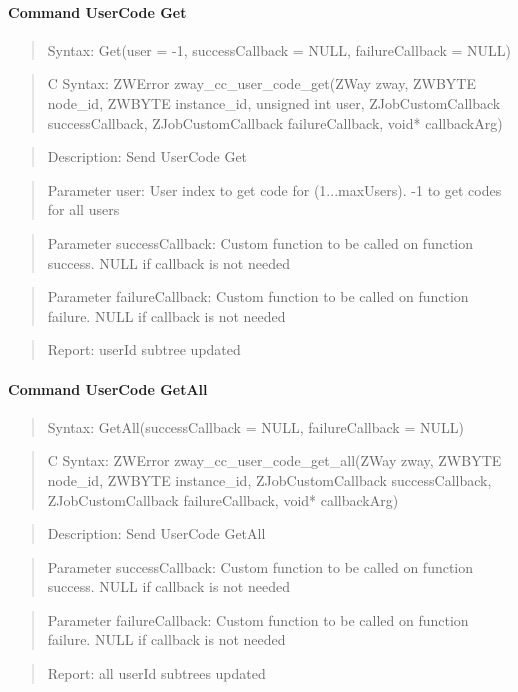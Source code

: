 \paragraph{Command UserCode Get}
\begin{quote}Syntax: Get(user = -1, successCallback = NULL, failureCallback = NULL)\end{quote}
\begin{quote}C Syntax: ZWError zway\_cc\_user\_code\_get(ZWay zway, ZWBYTE node\_id, ZWBYTE instance\_id, unsigned int user, ZJobCustomCallback successCallback, ZJobCustomCallback failureCallback, void* callbackArg)\end{quote}
\begin{quote}Description: Send UserCode Get\end{quote}
\begin{quote}Parameter user: User index to get code for (1...maxUsers). -1 to get codes for all users\end{quote}
\begin{quote}Parameter successCallback: Custom function to be called on function success. NULL if callback is not needed\end{quote}
\begin{quote}Parameter failureCallback: Custom function to be called on function failure. NULL if callback is not needed\end{quote}
\begin{quote}Report: userId subtree updated\end{quote}

\paragraph{Command UserCode GetAll}
\begin{quote}Syntax: GetAll(successCallback = NULL, failureCallback = NULL)\end{quote}
\begin{quote}C Syntax: ZWError zway\_cc\_user\_code\_get\_all(ZWay zway, ZWBYTE node\_id, ZWBYTE instance\_id, ZJobCustomCallback successCallback, ZJobCustomCallback failureCallback, void* callbackArg)\end{quote}
\begin{quote}Description: Send UserCode GetAll\end{quote}
\begin{quote}Parameter successCallback: Custom function to be called on function success. NULL if callback is not needed\end{quote}
\begin{quote}Parameter failureCallback: Custom function to be called on function failure. NULL if callback is not needed\end{quote}
\begin{quote}Report: all userId subtrees updated\end{quote}

